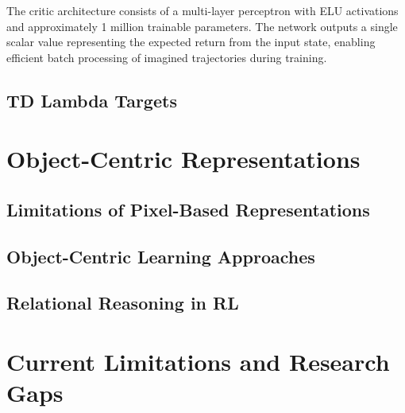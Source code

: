 \documentclass[
	english,
	ruledheaders=section,
	class=report,
	thesis={type=master},
	accentcolor=9c,
	custommargins=true,
	marginpar=false,
	parskip=half-,
	fontsize=11pt,
]{tudapub}
\begin{document}
The critic architecture consists of a multi-layer perceptron with ELU activations and approximately 1 million trainable parameters. The network outputs a single scalar value representing the expected return from the input state, enabling efficient batch processing of imagined trajectories during training.



\subsection{TD Lambda Targets}
\label{subsec:tdlambdatargets}





\section{Object-Centric Representations}
\label{sec:object_centric}

\subsection{Limitations of Pixel-Based Representations}
\label{subsec:pixel_limitations}

\subsection{Object-Centric Learning Approaches}
\label{subsec:oc_approaches}

\subsection{Relational Reasoning in RL}
\label{subsec:relational_reasoning}

\section{Current Limitations and Research Gaps}
\label{sec:limitations}
\end{document}
